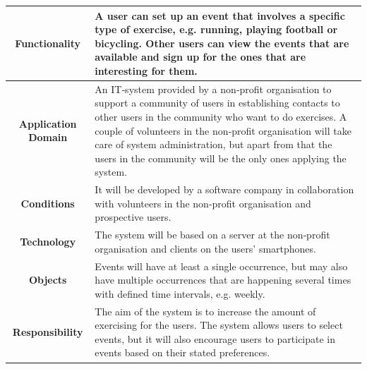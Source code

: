 \begin{center}
    \begin{tabular}{|c|p{9cm}|}
    \hline
        \textbf{Functionality} & A user can set up an event that involves a specific type of exercise, e.g. running, playing football or bicycling. Other users can view the events that are available and sign up for the ones that are interesting for them. \\  \hline
        \textbf{Application Domain} & An IT‐system provided by a non‐profit organisation to support a community of users in establishing contacts to other users in the community who want to do exercises. A couple of volunteers in the non‐profit organisation will take care of system administration, but apart from that the users in the community will be the only ones applying the system. \\  \hline
        \textbf{Conditions} & It will be developed by a software company in collaboration with volunteers in the non‐profit organisation and prospective users.  \\  \hline
        \textbf{Technology} & The system will be based on a server at the non‐profit organisation and clients on the users’ smartphones. \\ \hline
        \textbf{Objects} & Events will have at least a single occurrence, but may also have multiple occurrences that are happening several times with defined time intervals, e.g. weekly. \\ \hline
        \textbf{Responsibility} & The aim of the system is to increase the amount of exercising for the users. The system allows users to select events, but it will also encourage users to participate in events based on their stated preferences. \\ \hline
    \end{tabular}
\end{center}
